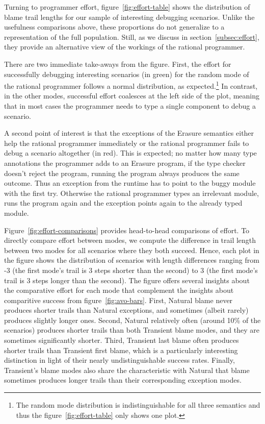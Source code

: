 Turning to programmer effort, figure~\ref{fig:effort-table} shows the distribution of blame trail lengths
for our sample of interesting debugging scenarios. Unlike the usefulness
comparisons above, these proportions do not generalize to a representation of the full population.
Still, as we discuss in section~\ref{subsec:effort}, they provide an
alternative view of the workings of the rational programmer. 

There are
two immediate take-aways from the figure. First, the effort for successfully
debugging interesting scenarios (in green) for the random mode of the
rational programmer follows  a normal distribution, as expected.\footnote{The
random mode distribution is indistinguishable for all three semantics and thus the figure~\ref{fig:effort-table} 
only shows one plot.} In contrast, in the other modes, successful effort coalesces at
the left side of the plot, meaning that in most cases the programmer needs
to type a single component to debug a scenario. 

A second point of interest is that the exceptions of
the Erasure semantics either help the rational programmer immediately or 
the rational programmer fails to debug a scenario altogether (in red).
This is expected; no matter how many type annotations the programmer
adds to an Erasure program, if the type checker doesn't reject the
program, running the program always produces the same outcome. Thus an
exception from the runtime has to point to the buggy module with
the first try. Otherwise the rational programmer types an irrelevant
module, runs the program again and the exception points again to the
already typed module. 

Figure~\ref{fig:effort-comparisons} provides head-to-head comparisons of effort.
To directly compare effort between modes, we compute the difference in trail length between two modes for all scenarios where they both succeed.
Hence, each plot in the figure shows the distribution of scenarios with length differences ranging from -3 (the first mode's trail is 3 steps shorter than the second) to 3 (the first mode's trail is 3 steps longer than the second).
The figure offers several insights about the comparative effort for each mode that complement the insights about comparitive success from figure~\ref{fig:avo-bars}.
First, Natural blame never produces shorter trails than Natural exceptions, and sometimes (albeit rarely) produces slightly longer ones.
Second, Natural relatively often (around 10\% of the scenarios) produces shorter trails than both Transient blame modes, and they are sometimes significantly shorter.
Third, Transient last blame often produces shorter trails than Transient first blame, which is a particularly interesting distinction in light of their nearly undistinguishable success rates.
Finally, Transient's blame modes also share the characteristic with Natural that blame sometimes produces longer trails than their corresponding exception modes.

